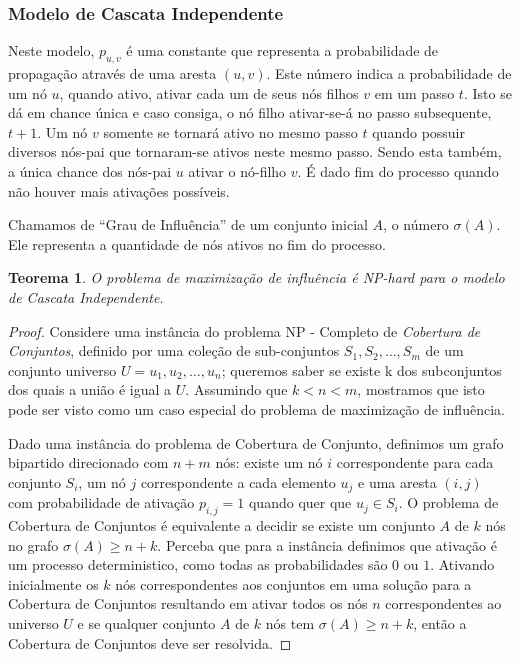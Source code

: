\documentclass{acm_proc_article-sp}
\newtheorem{thm}{Teorema}
\begin{document}
  \subsubsection{Modelo de Cascata Independente}\label{icm}
Neste modelo, $p_{u,v}$ é uma constante que representa a probabilidade de propagação através de uma aresta $(u,v)$. Este número 
indica a probabilidade de um nó $u$, quando ativo, ativar cada um de seus nós filhos $v$ em um passo $t$. Isto se dá em chance 
única e caso consiga, o nó filho ativar-se-á no passo subsequente, $t+1$. Um nó $v$ somente se tornará ativo no mesmo passo $t$ quando 
possuir diversos nós-pai que tornaram-se ativos neste mesmo passo. Sendo esta também, a única chance dos nós-pai $u$ ativar o 
nó-filho $v$. É dado fim do processo quando não houver mais ativações possíveis.

Chamamos de ``Grau de Influência'' de um conjunto inicial $A$, o número $\sigma(A)$. Ele representa a quantidade de nós 
ativos no fim do processo.

\begin{thm}
O problema de maximização de influência é NP-hard para o modelo de Cascata Independente.
\end{thm}

\begin{proof}
Considere uma instância do problema NP - Completo de \textit{Cobertura de Conjuntos}, definido por uma coleção de
sub-conjuntos $S_{1}, S_{2},\ldots,S_{m}$ de um conjunto universo $U = {u_{1},u_{2},\ldots,u_{n}}$; queremos saber
se existe k dos subconjuntos dos quais a união é igual a $U$. Assumindo que $k < n < m$, mostramos que isto pode
ser visto como um caso especial do problema de maximização de influência.

Dado uma instância do problema de Cobertura de Conjunto, definimos um grafo bipartido direcionado com $n + m$ nós:
existe um nó $i$ correspondente para cada conjunto $S_{i}$, um nó $j$ correspondente a cada elemento $u_{j}$ e uma
aresta $(i,j)$ com probabilidade de ativação $p_{i,j} = 1$ quando quer que $u_{j} \in S_{i}$. O problema de
Cobertura de Conjuntos é equivalente a decidir se existe um conjunto $A$ de $k$ nós no grafo $\sigma(A) \geq
n + k$. Perceba que para a instância definimos que ativação é um processo deterministico, como todas as
probabilidades são $0$ ou $1$. Ativando inicialmente os $k$ nós correspondentes aos conjuntos em uma solução para a
Cobertura de Conjuntos resultando em ativar todos os nós $n$ correspondentes ao universo $U$ e se qualquer conjunto
$A$ de $k$ nós tem $\sigma(A) \geq n + k$, então a Cobertura de Conjuntos deve ser resolvida.
\end{proof}
\end{document}
